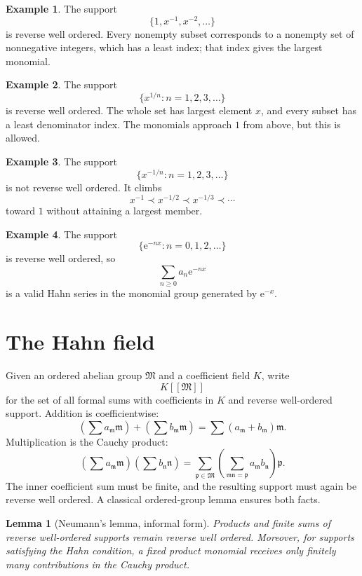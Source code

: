 \documentclass[11pt,openany]{book}
\theoremstyle{definition}
\newtheorem{example}{Example}[chapter]
\theoremstyle{plain}
\newtheorem{lemma}{Lemma}[chapter]
\theoremstyle{remark}
\newcommand{\M}{\mathfrak{M}}
\newcommand{\m}{\mathfrak{m}}
\newcommand{\n}{\mathfrak{n}}
\newcommand{\e}{\mathrm{e}}
\newcommand{\precdom}{\prec}
\begin{document}
\begin{example}
The support
\[
 \{1,x^{-1},x^{-2},\ldots\}
\]
is reverse well ordered. Every nonempty subset corresponds to a nonempty set of nonnegative integers, which has a least index; that index gives the largest monomial.
\end{example}

\begin{example}
The support
\[
 \{x^{1/n}:n=1,2,3,\ldots\}
\]
is reverse well ordered. The whole set has largest element $x$, and every subset has a least denominator index. The monomials approach $1$ from above, but this is allowed.
\end{example}

\begin{example}
The support
\[
 \{x^{-1/n}:n=1,2,3,\ldots\}
\]
is not reverse well ordered. It climbs
\[
 x^{-1}\precdom x^{-1/2}\precdom x^{-1/3}\precdom\cdots
\]
toward $1$ without attaining a largest member.
\end{example}

\begin{example}
The support
\[
 \{\e^{-n x}:n=0,1,2,\ldots\}
\]
is reverse well ordered, so
\[
 \sum_{n\ge0}a_n\e^{-nx}
\]
is a valid Hahn series in the monomial group generated by $\e^{-x}$.
\end{example}

\section{The Hahn field}

Given an ordered abelian group $\M$ and a coefficient field $K$, write
\[
 K[[\M]]
\]
for the set of all formal sums with coefficients in $K$ and reverse well-ordered support. Addition is coefficientwise:
\[
 \left(\sum a_{\m}\m\right)+
 \left(\sum b_{\m}\m\right)
 =\sum(a_{\m}+b_{\m})\m.
\]
Multiplication is the Cauchy product:
\begin{equation}\label{eq:hahn-product}
 \left(\sum a_{\m}\m\right)
 \left(\sum b_{\n}\n\right)
 =\sum_{\mathfrak p\in\M}
 \left(\sum_{\m\n=\mathfrak p}a_{\m}b_{\n}\right)\mathfrak p.
\end{equation}
The inner coefficient sum must be finite, and the resulting support must again be reverse well ordered. A classical ordered-group lemma ensures both facts.

\begin{lemma}[Neumann's lemma, informal form]\label{lem:neumann}
Products and finite sums of reverse well-ordered supports remain reverse well ordered. Moreover, for supports satisfying the Hahn condition, a fixed product monomial receives only finitely many contributions in the Cauchy product.
\end{lemma}
\end{document}
